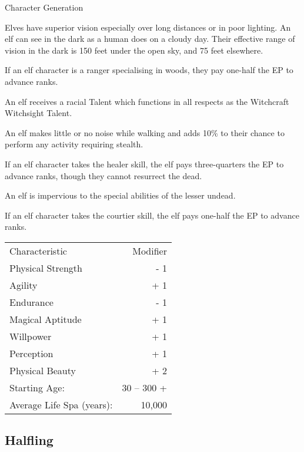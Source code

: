 \begin{Chapter}{Character Generation}
\begin{Enumerate}
\item Elves have superior vision especially over long distances or in
  poor lighting. An elf can see in the dark as a human does on a
  cloudy day. Their effective range of vision in the dark is 150 feet
  under the open sky, and 75 feet elsewhere.

\item If an elf character is a ranger specialising in woods, they pay
  one-half the EP to advance ranks.

\item An elf receives a racial Talent which functions in all respects
  as the Witchcraft Witchsight Talent.

\item An elf makes little or no noise while walking and adds 10\% to
  their chance to perform any activity requiring stealth.

\item If an elf character takes the healer skill, the elf pays
  three-quarters the EP to advance ranks, though they cannot resurrect
  the dead.

\item An elf is impervious to the special abilities of the lesser
  undead.

\item If an elf character takes the courtier skill, the elf pays
  one-half the EP to advance ranks.

\end{Enumerate}
  
\begin{tabularx}{\columnwidth}{Xr}
Characteristic			& Modifier \\
Physical Strength		& - 1 \\
Agility				& + 1 \\
Endurance			& - 1 \\ 
Magical Aptitude		& + 1 \\
Willpower			& + 1 \\
Perception			& + 1 \\
Physical Beauty			& + 2 \\
Starting Age:			& 30 -- 300 + \\
Average Life Spa (years):	& ~ 10,000 \\
\end{tabularx}

\subsection{Halfling}


\end{Chapter}
